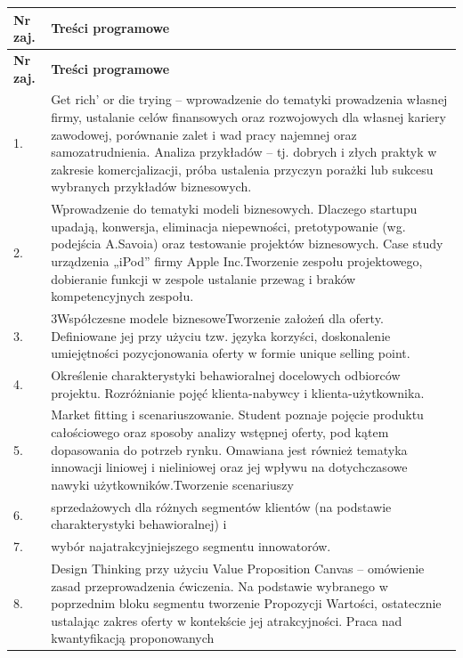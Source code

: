 \documentclass[12pt, a4paper]{article}
\newcommand{\thdrule}{\noalign{\global\setlength{\extrarowheight}{0pt}}}
\newcommand{\thdend}{\noalign{\global\setlength{\extrarowheight}{3pt}}}
\begin{document}
{\scriptsize
\begin{longtable}{m{1.5cm}m{14.5cm}}
\thdrule\toprule
\rowcolor{pjatkRed} {\color{white}\textbf{Nr zaj.}} & {\color{white}\textbf{Treści programowe}} \\
\midrule\thdend
\endfirsthead
\thdrule\toprule
\rowcolor{pjatkRed} {\color{white}\textbf{Nr zaj.}} & {\color{white}\textbf{Treści programowe}} \\
\midrule\thdend
\endhead
  \rowcolor{tableRowLight} 1. & Get rich’ or die trying – wprowadzenie do tematyki prowadzenia własnej firmy, ustalanie celów finansowych oraz rozwojowych dla własnej kariery zawodowej, porównanie zalet i wad pracy najemnej oraz samozatrudnienia. Analiza przykładów – tj. dobrych i złych praktyk w zakresie komercjalizacji, próba ustalenia przyczyn porażki lub sukcesu wybranych przykładów biznesowych. \\
  \rowcolor{tableRowAlt} 2. & Wprowadzenie do tematyki modeli biznesowych. Dlaczego startupu upadają, konwersja, eliminacja niepewności, pretotypowanie (wg. podejścia A.Savoia) oraz testowanie projektów biznesowych. Case study urządzenia „iPod” firmy Apple Inc.Tworzenie zespołu projektowego, dobieranie funkcji w zespole ustalanie przewag i braków kompetencyjnych zespołu. \\
  \rowcolor{tableRowLight} 3. & 3Współczesne modele biznesoweTworzenie założeń dla oferty. Definiowane jej przy użyciu tzw. języka korzyści, doskonalenie umiejętności pozycjonowania oferty w formie unique selling point. \\
  \rowcolor{tableRowAlt} 4. & Określenie charakterystyki behawioralnej docelowych odbiorców projektu. Rozróżnianie pojęć klienta-nabywcy i klienta-użytkownika. \\
  \rowcolor{tableRowLight} 5. & Market fitting i scenariuszowanie. Student poznaje pojęcie produktu całościowego oraz  sposoby analizy wstępnej oferty, pod kątem  dopasowania do potrzeb rynku. Omawiana jest również tematyka innowacji liniowej i nieliniowej oraz jej wpływu na dotychczasowe nawyki użytkowników.Tworzenie scenariuszy \\
  \rowcolor{tableRowAlt} 6. & sprzedażowych dla różnych segmentów klientów (na podstawie charakterystyki behawioralnej)  i \\
  \rowcolor{tableRowLight} 7. & wybór najatrakcyjniejszego segmentu innowatorów. \\
  \rowcolor{tableRowAlt} 8. & Design Thinking przy użyciu Value Proposition Canvas – omówienie zasad przeprowadzenia ćwiczenia. Na podstawie wybranego w poprzednim bloku segmentu tworzenie Propozycji Wartości, ostatecznie ustalając zakres oferty w kontekście jej atrakcyjności. Praca nad kwantyfikacją proponowanych \\

\end{longtable}}
\end{document}

